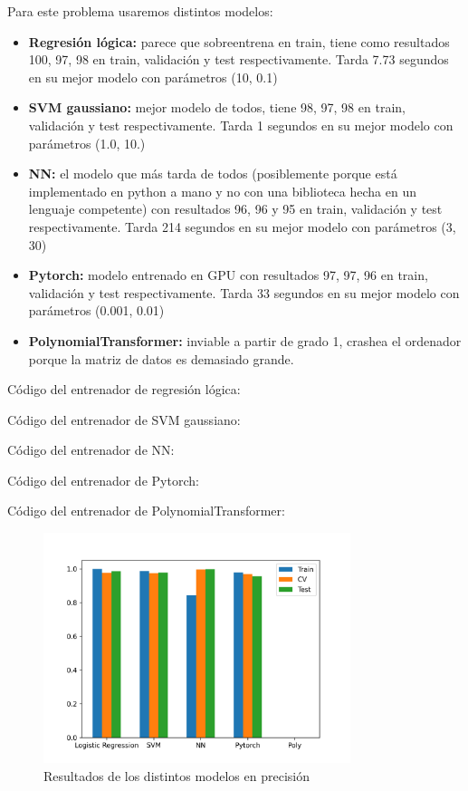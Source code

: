 \documentclass[6pt]{../../shared/AiTex}
\begin{document}
Para este problema usaremos distintos modelos:
\begin{itemize}
    \item \textbf{Regresión  lógica:} parece que  sobreentrena en train, tiene  como  resultados 100, 97, 98 en train, validación y test respectivamente. Tarda 7.73 segundos en su mejor modelo  con parámetros (10,  0.1)
    \item \textbf{SVM gaussiano:} mejor  modelo de todos, tiene 98, 97, 98 en train, validación y test respectivamente. Tarda  1 segundos en su mejor modelo con parámetros (1.0, 10.)
    \item \textbf{NN:} el modelo que más tarda de todos (posiblemente porque  está implementado en python  a mano y no con una biblioteca hecha en  un lenguaje competente) con resultados 96,  96 y  95 en train, validación y test respectivamente. Tarda  214 segundos en su mejor modelo con parámetros (3, 30)
    \item \textbf{Pytorch:} modelo entrenado en GPU con resultados 97, 97, 96 en train, validación y test respectivamente. Tarda  33 segundos en su mejor modelo con parámetros (0.001, 0.01)
    \item \textbf{PolynomialTransformer:} inviable a partir de grado  1, crashea  el ordenador porque la matriz de datos  es demasiado  grande.
\end{itemize}

Código del entrenador de regresión lógica:


Código del entrenador de SVM gaussiano:


Código del entrenador de NN:


Código del entrenador de Pytorch:


Código del entrenador de PolynomialTransformer:



\begin{figure}[H]
    \centering
    \includegraphics[width=0.8\textwidth]{./images/results.png}
    \caption{Resultados de los distintos modelos en precisión}
\end{figure}
\end{document}
